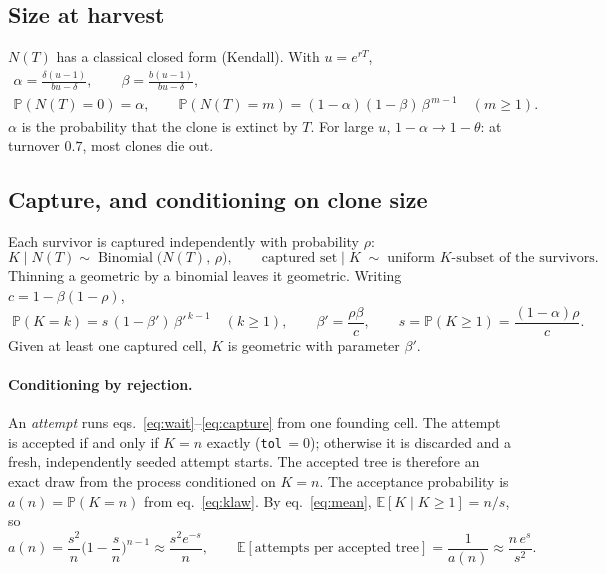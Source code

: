\documentclass[11pt]{article}
\newcommand{\bdrate}{b}          %
\newcommand{\dthrate}{\delta}    %
\newcommand{\turn}{\theta}       %
\newcommand{\net}{r}             %
\newcommand{\capt}{\rho}         %
\newcommand{\E}{\mathbb{E}}
\newcommand{\Prob}{\mathbb{P}}
\DeclareMathOperator{\Binomial}{Binomial}
\begin{document}
\subsection{Size at harvest}

$N(T)$ has a classical closed form (Kendall). With $u=e^{\net T}$,
\begin{equation}
\begin{gathered}
  \alpha = \frac{\dthrate(u-1)}{\bdrate u-\dthrate},\qquad
  \beta  = \frac{\bdrate(u-1)}{\bdrate u-\dthrate},\\[2pt]
  \Prob(N(T)=0)=\alpha,\qquad
  \Prob(N(T)=m)=(1-\alpha)(1-\beta)\,\beta^{\,m-1}\quad (m\ge1).
\end{gathered}
  \label{eq:geom}
\end{equation}
$\alpha$ is the probability that the clone is extinct by $T$. For large $u$, $1-\alpha\to 1-\turn$:
at turnover $0.7$, most clones die out.

\subsection{Capture, and conditioning on clone size}

Each survivor is captured independently with probability $\capt$:
\begin{equation}
  K \mid N(T) \sim \Binomial\big(N(T),\,\capt\big),
  \qquad\text{captured set} \mid K \;\sim\; \text{uniform $K$-subset of the survivors.}
  \label{eq:capture}
\end{equation}
Thinning a geometric by a binomial leaves it geometric. Writing $c=1-\beta(1-\capt)$,
\begin{equation}
  \boxed{\;
  \Prob(K=k) = s\,(1-\beta')\,\beta'^{\,k-1}\quad (k\ge1),\qquad
  \beta'=\frac{\capt\beta}{c},\qquad
  s=\Prob(K\ge1)=\frac{(1-\alpha)\capt}{c}. \;}
  \label{eq:klaw}
\end{equation}
Given at least one captured cell, $K$ is geometric with parameter $\beta'$.

\paragraph{Conditioning by rejection.} An \emph{attempt} runs eqs.~\eqref{eq:wait}--\eqref{eq:capture}
from one founding cell. The attempt is accepted if and only if $K=n$ exactly (\texttt{tol}\,$=0$);
otherwise it is discarded and a fresh, independently seeded attempt starts. The accepted tree is
therefore an exact draw from the process conditioned on $K=n$. The acceptance probability is
$a(n)=\Prob(K=n)$ from eq.~\eqref{eq:klaw}. By eq.~\eqref{eq:mean}, $\E[K\mid K\ge1]=n/s$, so
\begin{equation}
  a(n) = \frac{s^2}{n}\Big(1-\frac{s}{n}\Big)^{n-1} \approx \frac{s^2 e^{-s}}{n},
  \qquad
  \E[\text{attempts per accepted tree}] = \frac{1}{a(n)} \approx \frac{n\,e^{s}}{s^2}.
  \label{eq:attempts}
\end{equation}
\end{document}
